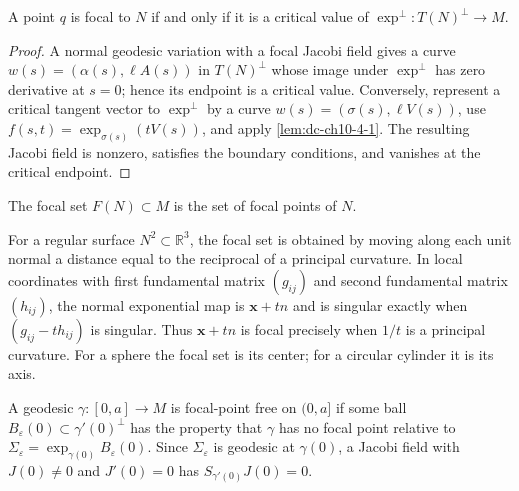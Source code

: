 \begin{proposition}
  \label{prop:dc-ch10-4-4}
  A point $q$ is focal to $N$ if and only if it is a critical value of
  $\exp^\perp:T(N)^\perp\to M$.
\end{proposition}
\begin{proof}
  \sketch
  A normal geodesic variation with a focal Jacobi field gives a curve
  $w(s)=(\alpha(s),\ell A(s))$ in $T(N)^\perp$ whose image under $\exp^\perp$ has
  zero derivative at $s=0$; hence its endpoint is a critical value. Conversely,
  represent a critical tangent vector to $\exp^\perp$ by a curve
  $w(s)=(\sigma(s),\ell V(s))$, use
  $f(s,t)=\exp_{\sigma(s)}(tV(s))$, and apply
  \cref{lem:dc-ch10-4-1}. The resulting Jacobi field is nonzero, satisfies the
  boundary conditions, and vanishes at the critical endpoint.
\end{proof}

\begin{definition}
  \label{def:dc-ch10-4-5}
  The focal set $F(N)\subset M$ is the set of focal points of $N$.
\end{definition}

\begin{example}
  \label{ex:dc-ch10-4-6}
  For a regular surface $N^2\subset\mathbb R^3$, the focal set is obtained by
  moving along each unit normal a distance equal to the reciprocal of a principal
  curvature. In local coordinates with first fundamental matrix $(g_{ij})$ and
  second fundamental matrix $(h_{ij})$, the normal exponential map is
  $\mathbf x+tn$ and is singular exactly when $(g_{ij}-th_{ij})$ is singular. Thus
  $\mathbf x+tn$ is focal precisely when $1/t$ is a principal curvature. For a
  sphere the focal set is its center; for a circular cylinder it is its axis.
\end{example}

\begin{definition}
  \label{def:dc-ch10-4-7}
  A geodesic $\gamma:[0,a]\to M$ is focal-point free on $(0,a]$ if some ball
  $B_\varepsilon(0)\subset\gamma'(0)^\perp$ has the property that $\gamma$ has no
  focal point relative to $\Sigma_\varepsilon=\exp_{\gamma(0)}B_\varepsilon(0)$.
  Since $\Sigma_\varepsilon$ is geodesic at $\gamma(0)$, a Jacobi field with
  $J(0)\ne0$ and $J'(0)=0$ has $S_{\gamma'(0)}J(0)=0$.
\end{definition}

